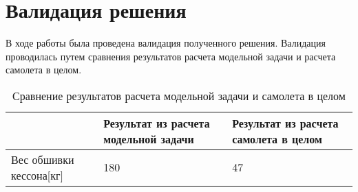 \chapter{Валидация решения}


В ходе работы была проведена валидация полученного решения. Валидация проводилась путем сравнения результатов расчета модельной задачи и расчета самолета в целом. 

\begin{table}[ht]
\caption{Сравнение результатов расчета модельной задачи и самолета в целом}
\label{tab:ComparingResults}
\begin{tabu}to \linewidth{|X[m c]|X[m c]|X[m c]|}
\hline
& Результат из расчета модельной задачи & Результат из расчета самолета в целом\\ \hline
Вес обшивки кессона[кг] & 180 & 47 \\ \hline


\end{tabu}
\end{table}
